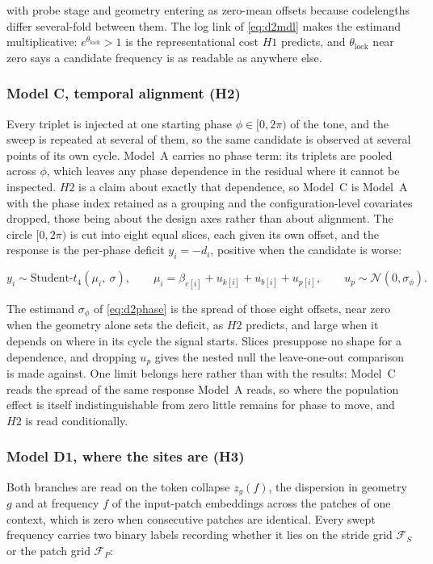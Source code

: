 with probe stage and geometry entering as zero-mean offsets because codelengths differ several-fold between them. The log link of \autoref{eq:d2mdl} makes the estimand multiplicative: $e^{\theta_{\mathrm{lock}}}>1$ is the representational cost $H1$ predicts, and $\theta_{\mathrm{lock}}$ near zero says a candidate frequency is as readable as anywhere else.

\subsubsection*{Model C, temporal alignment (H2)}
Every triplet is injected at one starting phase $\phi\in[0,2\pi)$ of the tone, and the sweep is repeated at several of them, so the same candidate is observed at several points of its own cycle. Model~A carries no phase term: its triplets are pooled across $\phi$, which leaves any phase dependence in the residual where it cannot be inspected. $H2$ is a claim about exactly that dependence, so Model~C is Model~A with the phase index retained as a grouping and the configuration-level covariates dropped, those being about the design axes rather than about alignment. The circle $[0,2\pi)$ is cut into eight equal slices, each given its own offset, and the response is the per-phase deficit $y_i=-d_i$, positive when the candidate is worse:

\begin{equation}
\label{eq:d2phase}
y_i \sim \text{Student-}t_4(\mu_i,\ \sigma),
\qquad
\mu_i = \beta_{c[i]} + u_{k[i]} + u_{b[i]} + u_{p[i]},
\qquad
u_p \sim \mathcal{N}(0, \sigma_\phi).
\end{equation}

The estimand $\sigma_\phi$ of \autoref{eq:d2phase} is the spread of those eight offsets, near zero when the geometry alone sets the deficit, as $H2$ predicts, and large when it depends on where in its cycle the signal starts. Slices presuppose no shape for a dependence, and dropping $u_p$ gives the nested null the leave-one-out comparison is made against. One limit belongs here rather than with the results: Model~C reads the spread of the same response Model~A reads, so where the population effect is itself indistinguishable from zero little remains for phase to move, and $H2$ is read conditionally.

\subsubsection*{Model D1, where the sites are (H3)}
Both branches are read on the token collapse $z_g(f)$, the dispersion in geometry $g$ and at frequency $f$ of the input-patch embeddings across the patches of one context, which is zero when consecutive patches are identical. Every swept frequency carries two binary labels recording whether it lies on the stride grid $\mathcal{F}_{S}$ or the patch grid $\mathcal{F}_{P}$:

